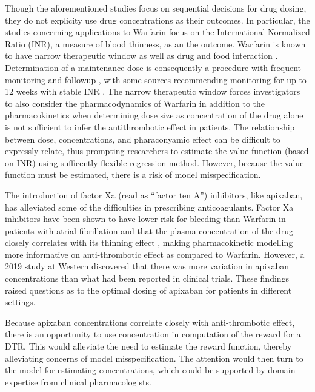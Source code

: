 Though the aforementioned studies focus on sequential decisions for drug dosing, they do not explicity use drug concentrations as their outcomes. In particular, the studies concerning applications to Warfarin focus on the International Normalized Ratio (INR), a measure of blood thinness, as an the outcome. Warfarin is known to have narrow therapeutic window \cite{merli2009warfarin} as well as drug and food interaction \cite{juurlink2007drug}. Determination of a maintenance dose is consequently a procedure with frequent monitoring and followup \cite{carris2015feasibility}, with some sources recommending monitoring for up to 12 weeks with stable INR \cite{holbrook2012evidence}. The narrow therapeutic window forces investigators to also consider the pharmacodynamics of Warfarin in addition to the pharmacokinetics when determining dose size as concentration of the drug alone is not sufficient to infer the antithrombotic effect in patients. The relationship between dose, concentrations, and pharaconyamic effect can be difficult to expressly relate, thus prompting researchers to estimate the value function (based on INR) using sufficently flexible regression method. However, because the value function must be estimated, there is a risk of model misspecification.

The introduction of factor Xa (read as ``factor ten A'') inhibitors, like apixaban, has alleviated some of the difficulties in prescribing anticoagulants. Factor Xa inhibitors have been shown to have lower risk for bleeding than Warfarin in patients with atrial fibrillation \cite{touma2015meta} and that the plasma concentration of the drug closely correlates with its thinning effect \cite{Byon2019-gf}, making pharmacokinetic modelling more informative on anti-thrombotic effect as compared to Warfarin. However, a 2019 study at Western \cite{sukumar2019apixaban} discovered that there was more variation in apixaban concentrations than what had been reported in clinical trials.  These findings raised questions as to the optimal dosing of apixaban for patients in different settings.

Because apixaban concentrations correlate closely with anti-thrombotic effect, there is an opportunity to use concentration in computation of the reward for a DTR.  This would alleviate the need to estimate the reward function, thereby alleviating concerns of model misspecification.  The attention would then turn to the model for estimating concentrations, which could be supported by domain expertise from clinical pharmacologists.

